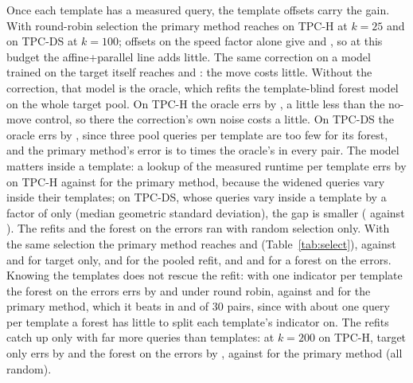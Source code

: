 \documentclass[conference]{IEEEtran}
\begin{document}
Once each template has a measured query, the template offsets carry the
gain. With round-robin selection the primary method reaches
\PLadTpchLowdimTemplateRoundRobin{} on TPC-H at $k=25$ and
\PLadTpcdsLowdimTemplateRoundRobin{} on TPC-DS at $k=100$; offsets on the
speed factor alone give \PLadTpchTemplateRawRoundRobin{} and
\PLadTpcdsTemplateRawRoundRobin, so at this budget the affine+parallel
line adds little. The same
correction on a model trained on the target itself reaches
\PLadTpchLowdimTemplateControlRoundRobin{} and
\PLadTpcdsLowdimTemplateControlRoundRobin: the move costs little. Without
the correction, that model is the oracle, which refits the template-blind
forest model on the whole target pool. On TPC-H the oracle errs by
\PLadTpchOracleRandom, a little less than the no-move control, so there the
correction's own noise costs a little. On TPC-DS the oracle errs by
\PLadTpcdsOracleRandom, since three pool queries per template are too few
for its forest, and the primary method's error is \PPrimOracleTPCDSMin{} to
\PPrimOracleTPCDSMax{} times the oracle's in every pair. The model matters inside a template: a lookup of the measured
runtime per template errs by \PLadTpchLookupRoundRobin{} on TPC-H against
\PLadTpchLowdimTemplateRoundRobin{} for the primary method, because the
widened queries vary inside their templates; on TPC-DS, whose queries vary
inside a template by a factor of only \PSpreadTPCDS{} (median geometric
standard deviation), the gap is smaller (\PLadTpcdsLookupRoundRobin{}
against \PLadTpcdsLowdimTemplateRoundRobin). The refits and the forest on
the errors ran with random selection only. With the same selection the
primary method reaches \PLTpchKTwoFiveRandomLowdimTemplate{} and
\PLTpcdsKOneZeroZeroRandomLowdimTemplate{} (Table~\ref{tab:select}), against
\PLadTpchTargetRandom{} and \PLadTpcdsTargetRandom{} for target only,
\PLadTpchPooledRandom{} and \PLadTpcdsPooledRandom{} for the pooled refit,
and \PLadTpchForestResidRandom{} and \PLadTpcdsForestResidRandom{} for a
forest on the errors. Knowing the templates does not rescue the refit: with
one indicator per template the forest on the errors errs by
\XtraTpchForestTplRrKTwoFive{} and \XtraTpcdsForestTplRrKOneZeroZero{}
under round robin, against \XtraTpchPrimaryRrKTwoFive{} and
\XtraTpcdsPrimaryRrKOneZeroZero{} for the primary method, which it beats in
\XtraTpchForestTplWinsRrKTwoFive{} and \XtraTpcdsForestTplWinsRrKOneZeroZero{}
of 30 pairs, since with about one query per template a forest has little
to split each template's indicator on. The refits catch up only with far more queries than
templates: at $k=200$ on TPC-H, target only errs by
\XtraTpchTargetRandKTwoZeroZero{} and the forest on the errors by
\XtraTpchForestResidRandKTwoZeroZero, against
\XtraTpchPrimaryRandKTwoZeroZero{} for the primary method (all random).
\end{document}
